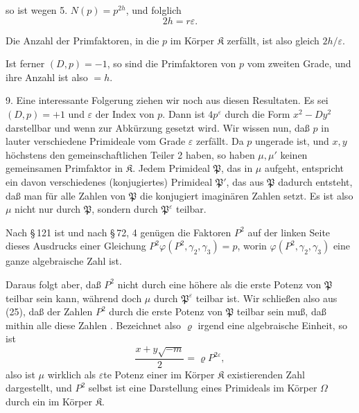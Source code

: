 so ist wegen 5. $N(p) = p^{2h}$, und folglich
\[
2h = r\varepsilon.
\]

Die Anzahl der Primfaktoren, in die $p$ im Körper $\mathfrak{K}$ zerfällt,
ist also gleich $2h/\varepsilon$.

Ist ferner $(D, p) = -1$, so sind die Primfaktoren von $p$ vom zweiten Grade, und ihre Anzahl ist also $= h$.

9. Eine interessante Folgerung ziehen wir noch aus diesen Resultaten. Es sei $(D, p) = +1$ und $\varepsilon$ der Index von $p$. Dann ist $4p^{\varepsilon}$ durch die Form $x^2 - Dy^2$ darstellbar und
wenn zur Abkürzung
gesetzt wird. Wir wissen nun, daß $p$ in lauter verschiedene Primideale vom Grade $\varepsilon$ zerfällt. Da $p$ ungerade ist, und $x, y$ höchstens den gemeinschaftlichen Teiler 2 haben, so haben $\mu, \mu'$ keinen gemeinsamen Primfaktor in $\mathfrak{K}$. Jedem Primideal $\mathfrak{P}$, das in $\mu$ aufgeht, entspricht ein davon verschiedenes (konjugiertes) Primideal $\mathfrak{P}'$, das aus $\mathfrak{P}$ dadurch entsteht, daß man für alle Zahlen von $\mathfrak{P}$ die konjugiert imaginären Zahlen setzt. Es ist also $\mu$ nicht nur durch $\mathfrak{P}$, sondern durch $\mathfrak{P}^{\varepsilon}$ teilbar.

Nach \S\,121 ist
und nach \S\,72, 4 genügen die Faktoren $P^2$ auf der linken Seite dieses Ausdrucks einer Gleichung $P^2\varphi(P^2, \gamma_2, \gamma_3) = p$, worin $\varphi(P^2, \gamma_2, \gamma_3)$ eine ganze algebraische Zahl ist.

Daraus folgt aber, daß $P^2$ nicht durch eine höhere als die erste Potenz von $\mathfrak{P}$ teilbar sein kann, während doch $\mu$ durch $\mathfrak{P}^{\varepsilon}$ teilbar ist. Wir schließen also aus (25), daß  der Zahlen $P^2$ durch die erste Potenz von $\mathfrak{P}$ teilbar sein muß, daß mithin alle diese Zahlen . Bezeichnet also $\varrho$ irgend eine algebraische Einheit, so ist
\[
\frac{x + y\sqrt{-m}}{2} = \varrho P^{2\varepsilon},
\]
also ist $\mu$ wirklich als $\varepsilon$te Potenz einer im Körper $\mathfrak{K}$ existierenden Zahl dargestellt, und $P^2$ selbst ist eine Darstellung eines Primideals im Körper $\Omega$ durch ein  im Körper $\mathfrak{K}$.
